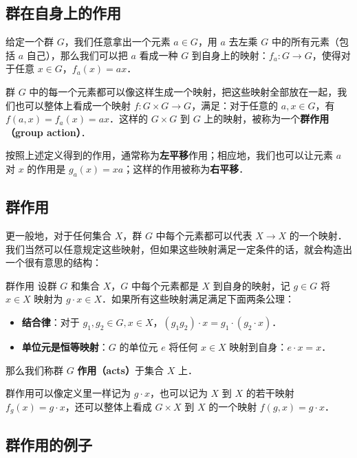 
\subsection{群在自身上的作用}

给定一个群 $G$，我们任意拿出一个元素 $a\in G$，用 $a$ 去左乘 $G$ 中的所有元素（包括 $a$ 自己），那么我们可以把 $a$ 看成一种 $G$ 到自身上的映射：$f_a:G\rightarrow G$，使得对于任意 $x\in G$，$f_a(x)=ax$．

群 $G$ 中的每一个元素都可以像这样生成一个映射，把这些映射全部放在一起，我们也可以整体上看成一个映射 $f:G\times G\rightarrow G$，满足：对于任意的 $a, x\in G$，有 $f(a,x)=f_a(x)=ax$．这样的 $G\times G$ 到 $G$ 上的映射，被称为一个\textbf{群作用（group action）}．

按照上述定义得到的作用，通常称为\textbf{左平移}作用；相应地，我们也可以让元素 $a$ 对 $x$ 的作用是 $g_a(x)=xa$；这样的作用被称为\textbf{右平移}．

\subsection{群作用}

更一般地，对于任何集合 $X$，群 $G$ 中每个元素都可以代表 $X\rightarrow X$ 的一个映射．我们当然可以任意规定这些映射，但如果这些映射满足一定条件的话，就会构造出一个很有意思的结构：

\begin{definition}{群作用}
设群 $G$ 和集合 $X$，$G$ 中每个元素都是 $X$ 到自身的映射，记 $g\in G$ 将 $x\in X$ 映射为 $g\cdot x\in X$．如果所有这些映射满足满足下面两条公理：
\begin{itemize}
\item \textbf{结合律}：对于 $g_1, g_2\in G, x\in X$，$(g_1 g_2)\cdot x=g_1\cdot (g_2\cdot x)$．
\item \textbf{单位元是恒等映射}：$G$ 的单位元 $e$ 将任何 $x\in X$ 映射到自身：$e\cdot x=x$．
\end{itemize}

那么我们称群 $G$ \textbf{作用（acts）}于集合 $X$ 上．

\end{definition}

群作用可以像定义里一样记为 $g\cdot x$，也可以记为 $X$ 到 $X$ 的若干映射 $f_g(x)=g\cdot x$，还可以整体上看成 $G\times X$ 到 $X$ 的一个映射 $f(g, x)=g\cdot x$．

\subsection{群作用的例子}

